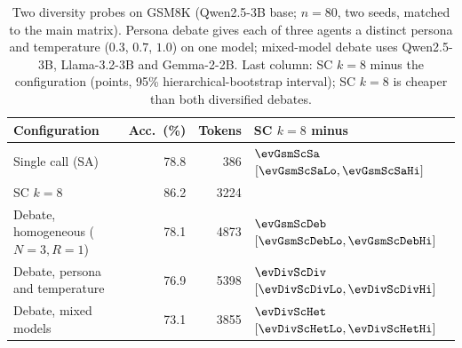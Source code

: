 \begin{table}[ht]\centering\small
\caption{Two diversity probes on GSM8K (Qwen2.5-3B base; $n{=}80$, two seeds,
matched to the main matrix). Persona debate gives each of three agents a distinct
persona and temperature ($0.3$, $0.7$, $1.0$) on one model; mixed-model debate
uses Qwen2.5-3B, Llama-3.2-3B and Gemma-2-2B. Last column: SC $k{=}8$ minus the
configuration (points, 95\% hierarchical-bootstrap interval); SC $k{=}8$ is cheaper
than both diversified debates.}
\label{tab:diversity}
\begin{tabular}{lrrl}
\toprule
Configuration & Acc.\ (\%) & Tokens & SC $k{=}8$ minus \\
\midrule
Single call (SA) & 78.8 & 386 & $\evGsmScSa$ $[\evGsmScSaLo,\evGsmScSaHi]$ \\
SC $k{=}8$ & 86.2 & 3224 & \\
Debate, homogeneous ($N{=}3,R{=}1$) & 78.1 & 4873 & $\evGsmScDeb$ $[\evGsmScDebLo,\evGsmScDebHi]$ \\
Debate, persona and temperature & 76.9 & 5398 & $\evDivScDiv$ $[\evDivScDivLo,\evDivScDivHi]$ \\
Debate, mixed models & 73.1 & 3855 & $\evDivScHet$ $[\evDivScHetLo,\evDivScHetHi]$ \\
\bottomrule
\end{tabular}
\end{table}
